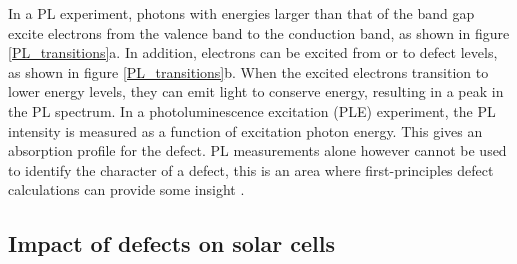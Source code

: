 \documentclass[11pt, twoside]{report}
\begin{document}

In a PL experiment, photons with energies larger than that of the band gap excite electrons from the valence band to the conduction band, as shown in figure \ref{PL_transitions}a. In addition, electrons can be excited from or to defect levels, as shown in figure \ref{PL_transitions}b. When the excited electrons transition to lower energy levels, they can emit light to conserve energy, resulting in a peak in the PL spectrum. In a photoluminescence excitation (PLE) experiment, the PL intensity is measured as a function of excitation photon energy. This gives an absorption profile for the defect. 
PL measurements alone however cannot be used to identify the character of a defect, this is an area where first-principles defect calculations can provide some insight \cite{defects_tutorial}. 

\subsection{Impact of defects on {\CZTS} solar cells}\label{CZTS_defects_lit}
\end{document}
